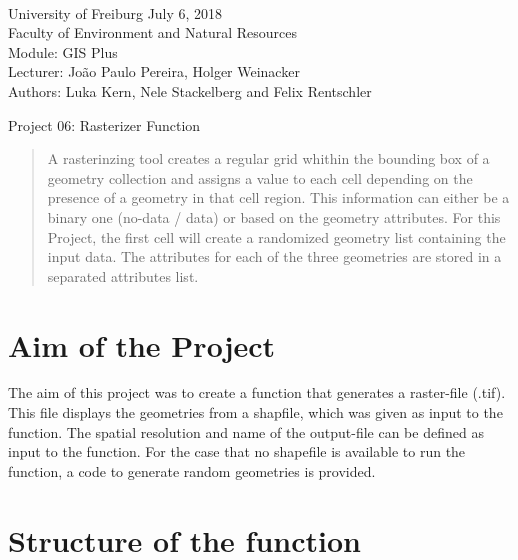 \documentclass[10pt, a4paper]{article}
\begin{document}
\markboth{}
\\\noindent University of Freiburg \hspace{10cm}  July 6, 2018
\\Faculty of Environment and Natural Resources
\\Module: GIS Plus
\\Lecturer: João Paulo Pereira, Holger Weinacker
\\Authors: Luka Kern, Nele Stackelberg and Felix Rentschler
\\

\begin{center}
	\huge{Project 06: Rasterizer Function} \vspace{0.5cm}\\
\end{center}

\onehalfspacing %



\begin{abstract}
	A rasterinzing tool creates a regular grid whithin the bounding box of a geometry collection and assigns a value to each cell depending on the presence of a geometry in that cell region. This information can either be a binary one (no-data / data) or based on the geometry attributes. For this Project, the first cell will create a randomized geometry list containing the input data. The attributes for each of the three geometries are stored in a separated attributes list.
\end{abstract}


\section{Aim of the Project}
The aim of this project was to create a function that generates a raster-file (.tif). This file displays the geometries from a shapfile, which was given as input to the function. The spatial resolution and name of the output-file can be defined as input to the function.
For the case that no shapefile is available to run the function, a code to generate random geometries is provided.


\section{Structure of the function}
\end{document}
